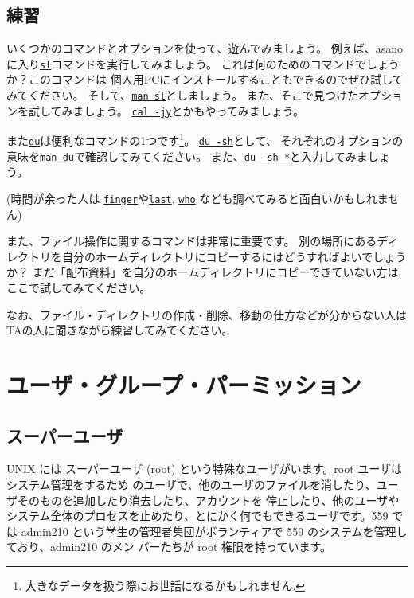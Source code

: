 \documentclass[a4j]{ltjreport}
\begin{document}
    \subsection{練習}
    いくつかのコマンドとオプションを使って、遊んでみましょう。
    例えば、asanoに入り\underline{\texttt{sl}}コマンドを実行してみましょう。
    これは何のためのコマンドでしょうか？このコマンドは
    個人用PCにインストールすることもできるのでぜひ試してみてください。
    そして、\underline{\texttt{man sl}}としましょう。
    また、そこで見つけたオプションを試してみましょう。
    \underline{\texttt{cal -jy}}とかもやってみましょう。

    また\underline{\texttt{du}}は便利なコマンドの1つです\footnote{大きなデータを扱う際にお世話になるかもしれません.}。
    \underline{\texttt{du -sh}}として、
    それぞれのオプションの意味を\underline{\texttt{man du}}で確認してみてください。
    また、\underline{\texttt{du -sh *}}と入力してみましょう。

    (時間が余った人は \underline{\texttt{finger}}や\underline{\texttt{last}}, 
    \underline{\texttt{who}} なども調べてみると面白いかもしれません)

    また、ファイル操作に関するコマンドは非常に重要です。
    別の場所にあるディレクトリを自分のホームディレクトリにコピーするにはどうすればよいでしょうか？
    まだ「配布資料」を自分のホームディレクトリにコピーできていない方はここで試してみてください。
    
    なお、ファイル・ディレクトリの作成・削除、移動の仕方などが分からない人はTAの人に聞きながら練習してみてください。




    \section{ユーザ・グループ・パーミッション}

    \subsection{スーパーユーザ}
    UNIX には スーパーユーザ (root) という特殊なユーザがいます。root ユーザはシステム管理をするため
    のユーザで、他のユーザのファイルを消したり、ユーザそのものを追加したり消去したり、アカウントを
    停止したり、他のユーザやシステム全体のプロセスを止めたり、とにかく何でもできるユーザです。559 で
    は admin210 という学生の管理者集団がボランティアで 559 のシステムを管理しており、admin210 のメン
    バーたちが root 権限を持っています。
\end{document}
